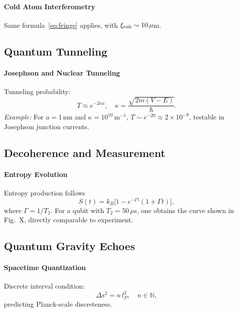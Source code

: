 \paragraph{Cold Atom Interferometry}  
Same formula~\eqref{eq:fringe} applies, with $\xi_{\rm coh}\sim10\,\mu$m.

\subsection{Quantum Tunneling}

\paragraph{Josephson and Nuclear Tunneling}  
Tunneling probability:
\begin{equation}\label{eq:tunnel}
T \approx e^{-2\kappa a}, 
\quad \kappa = \frac{\sqrt{2m(V - E)}}{\hbar}.
\tag{2}
\end{equation}
\emph{Example:} For $a=1\,$nm and $\kappa=10^{10}\,$m$^{-1}$, $T\sim e^{-20}\approx 2\times10^{-9}$, testable in Josephson junction currents.

\subsection{Decoherence and Measurement}

\paragraph{Entropy Evolution}  
Entropy production follows
\begin{equation}\label{eq:entropy}
S(t) = k_B\bigl[1 - e^{-\Gamma t}(1 + \Gamma t)\bigr],
\tag{3}
\end{equation}
where $\Gamma=1/T_2$.  For a qubit with $T_2=50\,\mu$s, one obtains the curve shown in Fig.~X, directly comparable to experiment.

\subsection{Quantum Gravity Echoes}

\paragraph{Spacetime Quantization}  
Discrete interval condition:
\begin{equation}\label{eq:spacetime_quant}
\Delta s^2 = n\,l_P^2,\quad n\in\mathbb{N},
\tag{4}
\end{equation}
predicting Planck‐scale discreteness.


